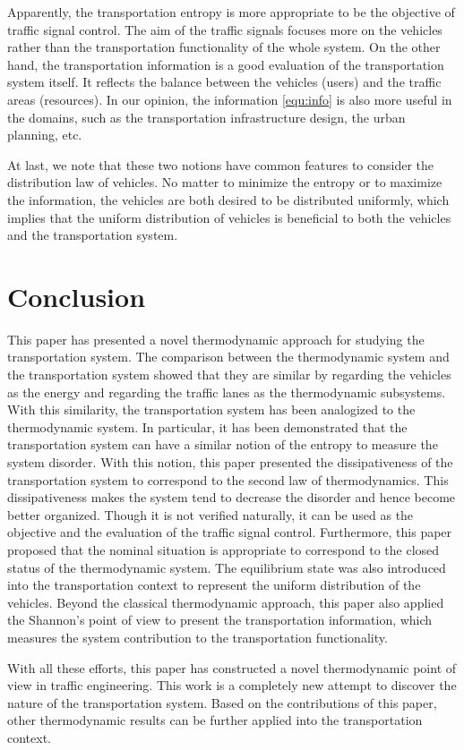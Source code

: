 \documentclass[preprint,authoryear,12pt]{elsarticle}
\begin{document}
Apparently, the transportation entropy is more appropriate to be the objective of traffic signal control. The aim of the traffic signals focuses more on the vehicles rather than the transportation functionality of the whole system. On the other hand, the transportation information is a good evaluation of the transportation system itself. It reflects the balance between the vehicles (users) and the traffic areas (resources). In our opinion, the information \eqref{equ:info} is also more useful in the domains, such as the transportation infrastructure design, the urban planning, etc.

At last, we note that these two notions have common features to consider the distribution law of vehicles. No matter to minimize the entropy or to maximize the information, the vehicles are both desired to be distributed uniformly, which implies that the uniform distribution of vehicles is beneficial to both the vehicles and the transportation system.

\section{Conclusion}

This paper has presented a novel thermodynamic approach for studying the transportation system. The comparison between the thermodynamic system and the transportation system showed that they are similar by regarding the vehicles as the energy and regarding the traffic lanes as the thermodynamic subsystems. With this similarity, the transportation system has been analogized to the thermodynamic system. In particular, it has been demonstrated that the transportation system can have a similar notion of the entropy to measure the system disorder. With this notion, this paper presented the dissipativeness of the transportation system to correspond to the second law of thermodynamics. This dissipativeness makes the system tend to decrease the disorder and hence become better organized. Though it is not verified naturally, it can be used as the objective and the evaluation of the traffic signal control. Furthermore, this paper proposed that the nominal situation is appropriate to correspond to the closed status of the thermodynamic system. The equilibrium state was also introduced into the transportation context to represent the uniform distribution of the vehicles. Beyond the classical thermodynamic approach, this paper also applied the Shannon's point of view to present the transportation information, which measures the system contribution to the transportation functionality.

With all these efforts, this paper has constructed a novel thermodynamic point of view in traffic engineering. This work is a completely new attempt to discover the nature of the transportation system. Based on the contributions of this paper, other thermodynamic results can be further applied into the transportation context.



\end{document}
